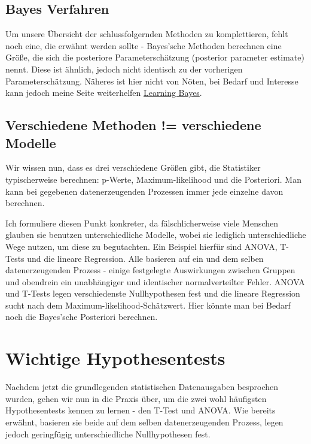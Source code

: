 \documentclass[a4paper,twoside]{tufte-book}\usepackage[]{graphicx}\usepackage[]{color}
\begin{document}
\subsection{Bayes Verfahren}

Um unsere Übersicht der schlussfolgernden Methoden zu komplettieren, fehlt noch eine, die erwähnt werden sollte - Bayes'sche Methoden berechnen eine Größe, die sich die posteriore Parameterschätzung (posterior parameter estimate) nennt. Diese ist ähnlich, jedoch nicht identisch zu der vorherigen Parameterschätzung. Näheres ist hier nicht von Nöten, bei Bedarf und Interesse kann jedoch meine Seite weiterhelfen \citep{Gelman-BayesianDataAnalysis-2003} \href{http://florianhartig.github.io/LearningBayes/}{Learning Bayes}.

\subsection{Verschiedene Methoden != verschiedene Modelle}

Wir wissen nun, dass es drei verschiedene Größen gibt, die Statistiker typischerweise berechnen: p-Werte, Maximum-likelihood und die Posteriori. Man kann bei gegebenen datenerzeugenden Prozessen immer jede einzelne davon berechnen.

Ich formuliere diesen Punkt konkreter, da fälschlicherweise viele Menschen glauben sie benutzen unterschiedliche Modelle, wobei sie lediglich unterschiedliche Wege nutzen, um diese zu begutachten. Ein Beispiel hierfür sind ANOVA, T-Tests und die lineare Regression. Alle basieren auf ein und dem selben datenerzeugenden Prozess - einige festgelegte Auswirkungen zwischen Gruppen und obendrein ein unabhängiger und identischer normalverteilter Fehler. ANOVA und T-Tests legen verschiedenste Nullhypothesen fest und die lineare Regression sucht nach dem Maximum-likelihood-Schätzwert. Hier könnte man bei Bedarf noch die Bayes'sche Posteriori berechnen. 

\section{Wichtige Hypothesentests}

Nachdem jetzt die grundlegenden statistischen Datenausgaben besprochen wurden, gehen wir nun in die Praxis über, um die zwei wohl häufigsten Hypothesentests kennen zu lernen - den T-Test und ANOVA. Wie bereits erwähnt, basieren sie beide auf dem selben datenerzeugenden Prozess, legen jedoch geringfügig unterschiedliche Nullhypothesen fest.
\end{document}

